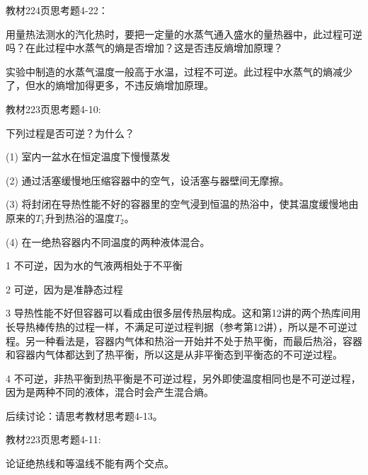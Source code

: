 \documentclass[CJK]{beamer}
\begin{document}
\begin{frame}
  \chtitle{\proid (\stwo)}
  \bch
  教材224页思考题4-22：

  用量热法测水的汽化热时，要把一定量的水蒸气通入盛水的量热器中，此过程可逆吗？在此过程中水蒸气的熵是否增加？这是否违反熵增加原理？
  \ech
\end{frame}


\begin{frame}
  \bch
  实验中制造的水蒸气温度一般高于水温，过程不可逆。此过程中水蒸气的熵减少了，但水的熵增加得更多，不违反熵增加原理。
  \ech
\end{frame}

\begin{frame}
  \chtitle{\proid (\stwo)}
  \bch
  教材223页思考题4-10:

  下列过程是否可逆？为什么？
  \bitem
\item[(1)]{室内一盆水在恒定温度下慢慢蒸发}
\item[(2)]{通过活塞缓慢地压缩容器中的空气，设活塞与器壁间无摩擦。}
\item[(3)]{将封闭在导热性能不好的容器里的空气浸到恒温的热浴中，使其温度缓慢地由原来的$T_1$升到热浴的温度$T_2$。}
\item[(4)]{在一绝热容器内不同温度的两种液体混合。}
  \eitem
  \ech
\end{frame}


\begin{frame}
  \bch
  \bitem
\item[1]{不可逆，因为水的气液两相处于不平衡}
\item[2]{可逆，因为是准静态过程}
\item[3]{导热性能不好但容器可以看成由很多层传热层构成。这和第12讲的两个热库间用长导热棒传热的过程一样，不满足可逆过程判据（参考第12讲），所以是不可逆过程。另一种看法是，容器内气体和热浴一开始并不处于热平衡，而最后热浴，容器和容器内气体都达到了热平衡，所以这是从非平衡态到平衡态的不可逆过程。}
\item[4]{不可逆，非热平衡到热平衡是不可逆过程，另外即使温度相同也是不可逆过程，因为是两种不同的液体，混合时会产生混合熵。}
  \eitem

  后续讨论：请思考教材思考题4-13。
  \ech
\end{frame}


\begin{frame}
\chtitle{\proid (\sone)}
\bch

教材223页思考题4-11:

论证绝热线和等温线不能有两个交点。
\ech
\end{frame}
\end{document}
